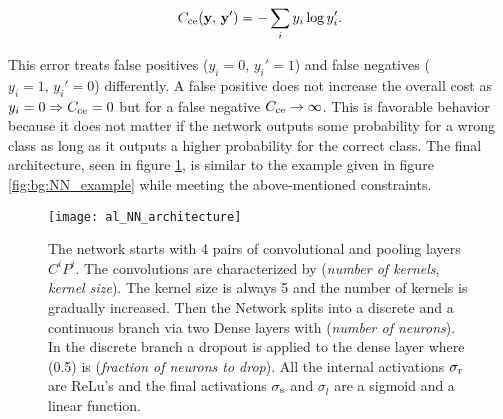 \begin{equation}
    C_{\mathrm{ce}}(\vb y, \, \vb y') = - \sum_i y_i \log y'_i.
\end{equation}

\noindent
This error treats false positives ($y_i = 0, \, y_i' = 1$) and false negatives ($y_i = 1, \, y_i' = 0$) differently. A false positive does not increase the overall cost as $y_i = 0 \Rightarrow C_{\mathrm{ce}} = 0$ but for a false negative $C_{\mathrm{ce}} \rightarrow \infty$. This is favorable behavior because it does not matter if the network outputs some probability for a wrong class as long as it outputs a higher probability for the correct class. The final architecture, seen in figure \ref{fig:al:NN_architecture}, is similar to the example given in figure \ref{fig:bg:NN_example} while meeting the above-mentioned constraints.

\begin{figure}[H]
    \centering
    \texttt{[image: al\_NN\_architecture]}
    \caption{The network starts with 4 pairs of convolutional and pooling layers $C^i P^i   $. The convolutions are characterized by (\textit{number of kernels}, \textit{kernel size}). The kernel size is always 5 and the number of kernels is gradually increased. Then the Network splits into a discrete and a continuous branch via two Dense layers with (\textit{number of neurons}). In the discrete branch a dropout is applied to the dense layer where (0.5) is (\textit{fraction of neurons to drop}).
    All the internal activations $\sigma_{\mathrm{r}}$ are ReLu's and the final activations $\sigma_{\mathrm{s}}$ and $\sigma_{l}$ are a sigmoid and a linear function.}
    \label{fig:al:NN_architecture}
\end{figure}

\newpage
